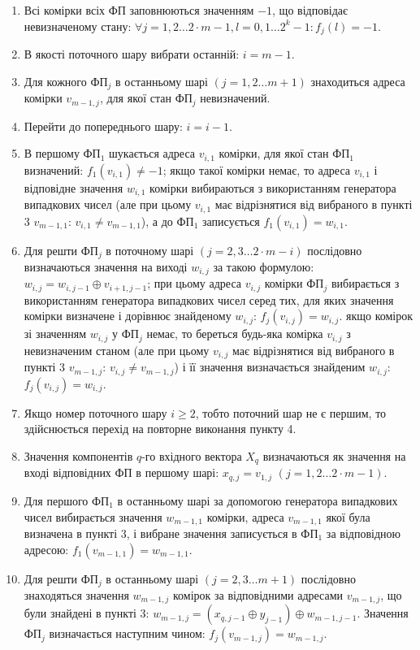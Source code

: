 \documentclass[12pt]{article}
\begin{document}
\begin{enumerate}
\itemsep=0em
\item Всі комірки всіх ФП заповнюються значенням $-1$, що відповідає невизначеному стану: $\forall j=1,2 \ldots 2 \cdot m-1, l=0,1 \ldots 2^k-1 : f_j(l) = -1$.
\item В якості поточного шару вибрати останній: $i=m-1$.
\item Для кожного ФП$_j$ в останньому шарі $(j=1,2 \ldots m+1)$ знаходиться адреса комірки $v_{m-1,j}$, для якої стан ФП$_j$ невизначений.
\item Перейти до попереднього шару: $i=i-1$.
\item В першому ФП$_1$ шукається адреса $v_{i,1}$ комірки, для якої стан ФП$_1$ визначений: $f_1(v_{i,1}) \neq -1$;
якщо такої комірки немає, то адреса $v_{i,1}$ і відповідне значення $w_{i,1}$ комірки вибираються з використанням генератора випадкових чисел (але при цьому $v_{i,1}$ має відрізнятися від вибраного в пункті 3 $v_{m-1,1}$: $v_{i,1} \neq v_{m-1,1}$), а до ФП$_1$ записується $f_1(v_{i,1})=w_{i,1}$.
\item Для решти ФП$_j$ в поточному шарі $(j=2,3 \ldots 2 \cdot m-i)$ послідовно визначаються значення на виході $w_{i,j}$ за такою формулою: $w_{i,j} = w_{i,j-1} \oplus v_{i+1,j-1}$;
при цьому адреса $v_{i,j}$ комірки ФП$_j$ вибирається з використанням генератора випадкових чисел серед тих, для яких значення комірки визначене і дорівнює знайденому $w_{i,j}$: $f_j(v_{i,j})=w_{i,j}$.
якщо комірок зі значенням $w_{i,j}$ у ФП$_j$ немає, то береться будь-яка комірка $v_{i,j}$ з невизначеним станом (але при цьому $v_{i,j}$ має відрізнятися від вибраного в пункті 3 $v_{m-1,j}$: $v_{i,j} \neq v_{m-1,j}$) і її значення визначається знайденим $w_{i,j}$: $f_j(v_{i,j})=w_{i,j}$.
\item Якщо номер поточного шару $i \geq 2$, тобто поточний шар не є першим, то здійснюється перехід на повторне виконання пункту 4.
\item Значення компонентів $q$-го вхідного вектора $X_q$ визначаються як значення на вході відповідних ФП в першому шарі: $x_{q,j}=v_{1,j}$ $(j=1,2 \ldots 2 \cdot m-1)$.
\item Для першого ФП$_1$ в останньому шарі за допомогою генератора випадкових чисел вибирається значення $w_{m-1,1}$ комірки, адреса $v_{m-1,1}$ якої була визначена в пункті 3, і вибране значення записується в ФП$_1$ за відповідною адресою: $f_1(v_{m-1,1})=w_{m-1,1}$.
\item Для решти ФП$_j$ в останньому шарі $(j=2,3 \ldots m+1)$ послідовно знаходяться значення $w_{m-1,j}$ комірок за відповідними адресами $v_{m-1,j}$, що були знайдені в пункті 3: $w_{m-1,j}=(x_{q,j-1} \oplus y_{j-1}) \oplus w_{m-1,j-1}$. Значення ФП$_j$ визначається наступним чином: $f_j(v_{m-1,j}) = w_{m-1,j}$.

\end{enumerate}
\end{document}
